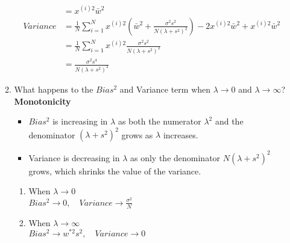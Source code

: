 \documentclass{article}
\theoremstyle{definition}
\theoremstyle{remark}
\begin{document}
\begin{enumerate}[font={\Large\bfseries},left=0pt]
\begin{enumerate}
\begin{align}
			                                                                                                                       & = x^{(i)2}\bar{w}^2                                                                                                                                                  \\[2pt]
			      Variance                                                                                                         & = \frac{1}{N} \sum^N_{i = 1} x^{(i)2}\left(\bar{w}^2 + \frac{\sigma^2 s^2}{N(\lambda + s^2)^2} \right) - 2x^{(i)2} \bar{w}^2 + x^{(i)2}\bar{w}^2                     \\[2pt]
			                                                                                                                       & = \frac{1}{N} \sum^N_{i = 1} x^{(i)2} \frac{\sigma^2 s^2}{N(\lambda + s^2)^2}                                                                                        \\[2pt]
			                                                                                                                       & = \frac{\sigma^2 s^4}{N(\lambda + s^2)^2}
		      \end{align}
		\item What happens to the $Bias^2$ and Variance term when $\lambda \rightarrow 0$ and $\lambda \rightarrow \infty$? \\
		      \textbf{Monotonicity}
		      \begin{itemize}
			      \item $Bias^2$ is increasing in $\lambda$ as both the numerator $\lambda^2$ and the denominator $(\lambda + s^2)^2$ grows as $\lambda$ increases.
			      \item Variance is decreasing in $\lambda$ as only the denominator $N(\lambda + s^2)^2$ grows, which shrinks the value of the variance.
		      \end{itemize}
		      \begin{enumerate}
			      \item When $\lambda \rightarrow 0$ \\
			            $Bias^2 \rightarrow 0, \quad Variance \rightarrow \frac{\sigma^2}{N}$
			      \item When $\lambda \rightarrow \infty$ \\
			            $Bias^2 \rightarrow w^{*2}s^2, \quad Variance \rightarrow 0$
		      \end{enumerate}


\end{enumerate}
\end{enumerate}
\end{document}
